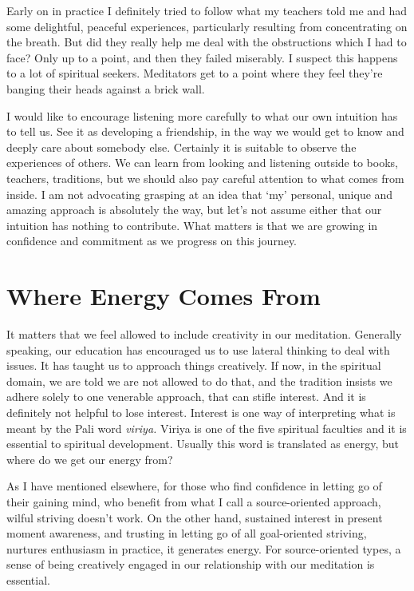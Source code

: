 Early on in practice I definitely tried to follow what my teachers told
me and had some delightful, peaceful experiences, particularly resulting
from concentrating on the breath. But did they really help me deal with
the obstructions which I had to face? Only up to a point, and then they
failed miserably. I suspect this happens to a lot of spiritual seekers.
Meditators get to a point where they feel they’re banging their heads
against a brick wall.

I would like to encourage listening more carefully to what our own
intuition has to tell us. See it as developing a friendship, in the way
we would get to know and deeply care about somebody else. Certainly it
is suitable to observe the experiences of others. We can learn from
looking and listening outside to books, teachers, traditions, but we
should also pay careful attention to what comes from inside. I am not
advocating grasping at an idea that ‘my’ personal, unique and amazing
approach is absolutely the way, but let’s not assume either that our
intuition has nothing to contribute. What matters is that we are growing
in confidence and commitment as we progress on this journey.

\section{Where Energy Comes From}

It matters that we feel allowed to include creativity in our meditation.
Generally speaking, our education has encouraged us to use lateral
thinking to deal with issues. It has taught us to approach things
creatively. If now, in the spiritual domain, we are told we are not
allowed to do that, and the tradition insists we adhere solely to one
venerable approach, that can stifle interest. And it is definitely not
helpful to lose interest. Interest is one way of interpreting what is
meant by the Pali word \emph{viriya.} Viriya is one of the five spiritual
faculties\cite{faculties} and it is essential to spiritual development. Usually this
word is translated as energy, but where do we get our energy from?

As I have mentioned elsewhere, for those who find confidence in letting
go of their gaining mind, who benefit from what I call a source-oriented
approach, wilful striving doesn’t work. On the other hand, sustained
interest in present moment awareness, and trusting in letting go of all
goal-oriented striving, nurtures enthusiasm in practice, it generates
energy. For source-oriented types, a sense of being creatively engaged
in our relationship with our meditation is essential.

